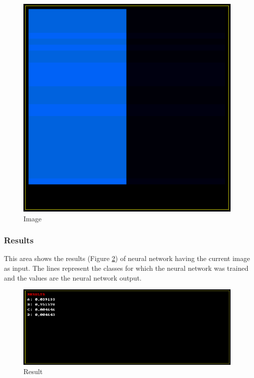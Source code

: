 \documentclass[12pt]{article}
\begin{document}
\begin{figure}[H]
    \centering
    \includegraphics[scale=0.60]{images/image.png}
    \caption{Image}
    \label{image}
\end{figure}

\subsubsection*{Results}
This area shows the results (Figure \ref{results}) of neural network having
the current image as input. The lines represent the classes for which the
neural network was trained and the values are the neural network output.

\begin{figure}[H]
    \centering
    \includegraphics[scale=0.60]{images/results.png}
    \caption{Result}
    \label{results}
\end{figure}
\end{document}
